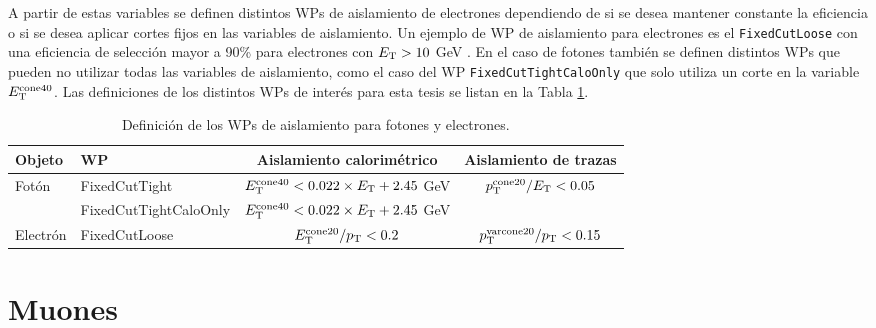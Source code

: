 
A partir de estas variables se definen distintos WPs de aislamiento de electrones dependiendo de si se desea mantener constante la eficiencia o si se desea aplicar cortes fijos en las variables de aislamiento. Un ejemplo de WP de aislamiento para electrones es el \texttt{FixedCutLoose} con una eficiencia de selección mayor a 90\% para electrones con $E_{\text{T}}>10$ GeV \cite{EGAM-2018-01}. En el caso de fotones también se definen distintos WPs que pueden no utilizar todas las variables de aislamiento, como el caso del WP \texttt{FixedCutTightCaloOnly} que solo utiliza un corte en la variable $E_{\text{T}}^{\text{cone40}}$. Las definiciones de los distintos WPs de interés para esta tesis se listan en la Tabla \ref{IDWPs}.



\begin{table} 
\centering
\caption{Definición de los WPs de aislamiento para fotones y electrones. 
}
	\begin{tabular}{ l l c c}

		Objeto & WP & Aislamiento calorimétrico & Aislamiento de trazas \\

		\hline
		\hline

		Fotón & FixedCutTight & $E_{\text{T}}^{\text{cone40}} < 0.022\times E_{\text{T}} + 2.45$ GeV & $p_{\text{T}}^{\text{cone20}}/E_{\text{T}}<0.05$ \\

		 & FixedCutTightCaloOnly & $E_{\text{T}}^{\text{cone40}} < 0.022\times E_{\text{T}} + 2.45$ GeV &  \\

		\hline

		Electrón & FixedCutLoose & $E_{\text{T}}^{\text{cone20}}/p_{\text{T}}<0.2$ & $p_{\text{T}}^{\text{varcone20}}/p_{\text{T}}<0.15$\\

	\end{tabular}
\label{IDWPs}
\end{table}








\section{Muones}

